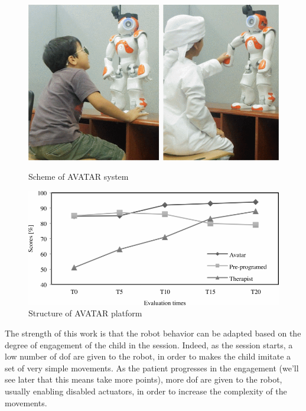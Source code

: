 \documentclass[12pt,journal,draftclsnofoot,onecolumn]{IEEEtran}
\begin{document}
\begin{figure}[h]
\centering

\begin{minipage}{0.48\textwidth}
\centering
\includegraphics[width=\textwidth]{nao_robot.png}
\caption{Scheme of AVATAR system}
\label{fig:nao_robot}
\end{minipage}
\begin{minipage}{0.48\textwidth}
\centering
\includegraphics[width=\textwidth]{scores.png}
\caption{Structure of AVATAR platform}
\label{fig:scores}
\end{minipage}

\end{figure}

The strength of this work is that the robot behavior can be adapted based on the degree of engagement of the child in the session.
Indeed, as the session starts, a low number of \gls{dof} are given to the robot, in order to makes the child imitate a set of very simple movements.
As the patient progresses in the engagement (we'll see later that this means take more points), more \gls{dof} are given to the robot, usually enabling disabled actuators, in order to increase the complexity of the movements.
\end{document}
